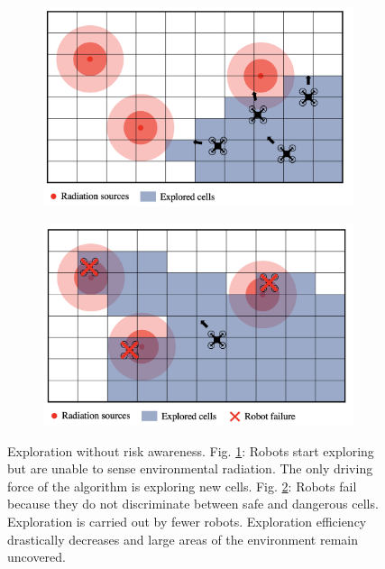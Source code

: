 \begin{figure}
     \centering
     \begin{subfigure}{0.45\textwidth}
         \centering
         \includegraphics[width=\textwidth]{figures/dora_explorer/risk_aware_b.png}
         \caption{}
         \label{risk_unaware_a}
     \end{subfigure}
     \begin{subfigure}{0.45\textwidth}
         \centering
         \includegraphics[width=\textwidth]{figures/dora_explorer/risk_unaware_a.png}
         \caption{}
         \label{risk_unaware_b}
     \end{subfigure}
        \caption[Risk-unaware exploration intuition]{Exploration without risk awareness. Fig. \ref{risk_unaware_a}: Robots start exploring but are unable to sense environmental radiation. The only driving force of the algorithm is exploring new cells. Fig. \ref{risk_unaware_b}: Robots fail because they do not discriminate between safe and dangerous cells. Exploration is carried out by fewer robots. Exploration efficiency drastically decreases and large areas of the environment remain uncovered.}
        \label{risk_unaware}
\end{figure}

